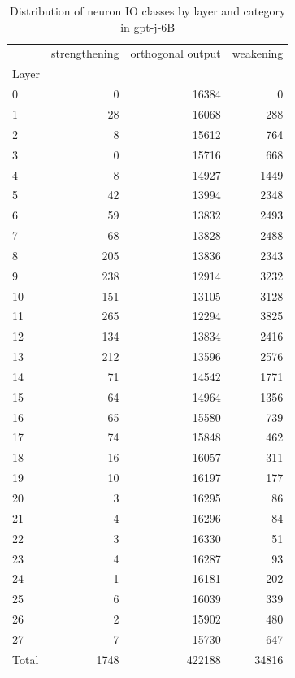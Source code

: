 \begin{table}
\caption{Distribution of neuron IO classes by layer and category in gpt-j-6B}
\label{tab:gpt-j-6B}
\begin{tabular}{lrrr}
 & strengthening & orthogonal output & weakening \\
Layer &  &  &  \\
0 & 0 & 16384 & 0 \\
1 & 28 & 16068 & 288 \\
2 & 8 & 15612 & 764 \\
3 & 0 & 15716 & 668 \\
4 & 8 & 14927 & 1449 \\
5 & 42 & 13994 & 2348 \\
6 & 59 & 13832 & 2493 \\
7 & 68 & 13828 & 2488 \\
8 & 205 & 13836 & 2343 \\
9 & 238 & 12914 & 3232 \\
10 & 151 & 13105 & 3128 \\
11 & 265 & 12294 & 3825 \\
12 & 134 & 13834 & 2416 \\
13 & 212 & 13596 & 2576 \\
14 & 71 & 14542 & 1771 \\
15 & 64 & 14964 & 1356 \\
16 & 65 & 15580 & 739 \\
17 & 74 & 15848 & 462 \\
18 & 16 & 16057 & 311 \\
19 & 10 & 16197 & 177 \\
20 & 3 & 16295 & 86 \\
21 & 4 & 16296 & 84 \\
22 & 3 & 16330 & 51 \\
23 & 4 & 16287 & 93 \\
24 & 1 & 16181 & 202 \\
25 & 6 & 16039 & 339 \\
26 & 2 & 15902 & 480 \\
27 & 7 & 15730 & 647 \\
Total & 1748 & 422188 & 34816 \\
\end{tabular}
\end{table}
